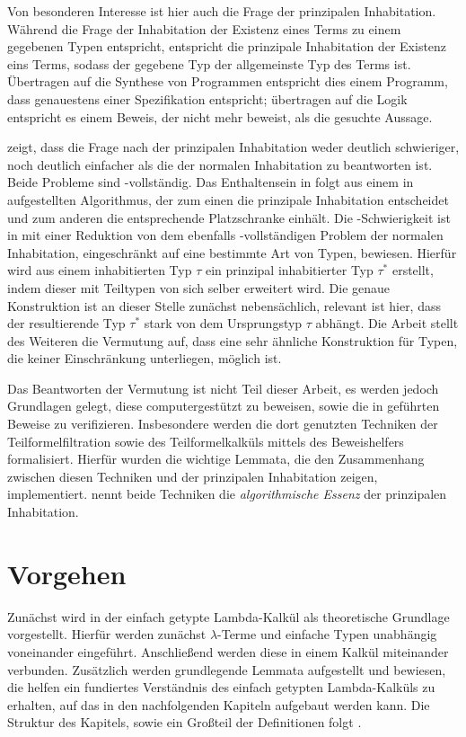 Von besonderen Interesse ist hier auch die Frage der prinzipalen Inhabitation. Während die Frage der Inhabitation der Existenz eines Terms zu einem gegebenen Typen entspricht, entspricht die prinzipale Inhabitation der Existenz eins Terms, sodass der gegebene Typ der allgemeinste Typ des Terms ist. Übertragen auf die Synthese von Programmen entspricht dies einem Programm, dass genauestens einer Spezifikation entspricht; übertragen auf die Logik entspricht es einem Beweis, der nicht mehr beweist, als die gesuchte Aussage.

\cite{dudenhefner} zeigt, dass die Frage nach der prinzipalen Inhabitation weder deutlich schwieriger, noch deutlich einfacher als die der normalen Inhabitation zu beantworten ist. Beide Probleme sind \PSPACE-vollständig. Das Enthaltensein in \PSPACE{} folgt aus einem in \cite{dudenhefner} aufgestellten Algorithmus, der zum einen die prinzipale Inhabitation entscheidet und zum anderen die entsprechende Platzschranke einhält. Die \PSPACE-Schwierigkeit ist in \cite{dudenhefner} mit einer Reduktion von dem ebenfalls \PSPACE-vollständigen Problem der normalen Inhabitation, eingeschränkt auf eine bestimmte Art von Typen, bewiesen. Hierfür wird aus einem inhabitierten Typ $\tau$ ein prinzipal inhabitierter Typ $\tau^*$ erstellt, indem dieser mit Teiltypen von sich selber erweitert wird. Die genaue Konstruktion ist an dieser Stelle zunächst nebensächlich, relevant ist hier, dass der resultierende Typ $\tau^*$ stark von dem Ursprungstyp $\tau$ abhängt. Die Arbeit stellt des Weiteren die Vermutung auf, dass eine sehr ähnliche Konstruktion für Typen, die keiner Einschränkung unterliegen, möglich ist. 

Das Beantworten der Vermutung ist nicht Teil dieser Arbeit, es werden jedoch Grundlagen gelegt, diese computergestützt zu beweisen, sowie die in \cite{dudenhefner} geführten Beweise zu verifizieren. Insbesondere werden die dort genutzten Techniken der Teilformelfiltration sowie des Teilformelkalküls mittels des Beweishelfers \coq{} formalisiert. Hierfür wurden die wichtige Lemmata, die den Zusammenhang zwischen diesen Techniken und der prinzipalen Inhabitation zeigen, implementiert. \cite{dudenhefner} nennt beide Techniken die \emph{algorithmische Essenz} der prinzipalen Inhabitation. 

\section{Vorgehen}
Zunächst wird in  der einfach getypte Lambda-Kalkül als theoretische Grundlage vorgestellt. Hierfür werden zunächst $\lambda$-Terme und einfache Typen unabhängig voneinander eingeführt. Anschließend werden diese in einem Kalkül miteinander verbunden. Zusätzlich werden grundlegende Lemmata aufgestellt und bewiesen, die helfen ein fundiertes Verständnis des einfach getypten Lambda-Kalküls zu erhalten, auf das in den nachfolgenden Kapiteln aufgebaut werden kann. Die Struktur des Kapitels, sowie ein Großteil der Definitionen folgt \cite{lecturesCH}.

